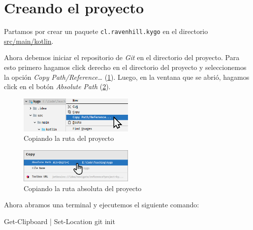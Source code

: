 \section{Creando el proyecto}
  Partamos por crear un paquete \texttt{cl.ravenhill.kygo} en el directorio \url{src/main/kotlin}.

  Ahora debemos iniciar el repositorio de \textit{Git} en el directorio del proyecto.
  Para esto primero hagamos click derecho en el directorio del proyecto y seleccionemos la opción
  \textit{Copy Path/Reference\dots} (\cref{fig:copy-path}).
  Luego, en la ventana que se abrió, hagamos click en el botón \textit{Absolute Path} 
  (\cref{fig:abs-path}).

  \begin{figure}[H]
    \centering
    \includegraphics[width=0.5\textwidth]{img/oop/principios/vcs/copy-path.png}
    \caption{Copiando la ruta del proyecto}
    \label{fig:copy-path}
  \end{figure}

  \begin{figure}[H]
    \centering
    \includegraphics[width=0.5\textwidth]{img/oop/principios/vcs/abs-path.png}
    \caption{Copiando la ruta absoluta del proyecto}
    \label{fig:abs-path}
  \end{figure}

  Ahora abramos una terminal y ejecutemos el siguiente comando:

  \begin{defaultbox}[Windows]
    \begin{powershell}
      Get-Clipboard | Set-Location
      git init
    \end{powershell}
  \end{defaultbox}

  \begin{defaultbox}[Linux]
  \end{defaultbox}

